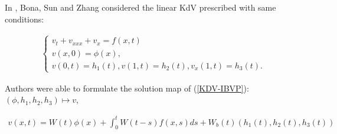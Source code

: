 \documentclass[10pt,a4paper,final]{article}
\numberwithin{equation}{section}
\begin{document}
In \cite{BSZ3}, Bona, Sun and Zhang considered the linear KdV prescribed with same conditions:

\begin{eqnarray}\label{KDV-IBVP}
\begin{cases}
v_t + v_{xxx} + v_x = f(x,t)\\
v(x,0)=\phi(x),\\
v(0,t)=h_1(t), v(1,t)=h_2(t), v_x(1,t)=h_3(t). 
\end{cases}
\end{eqnarray}

Authors were able to formulate the solution map of (\ref{KDV-IBVP}): $(\phi, h_1, h_2, h_3)\mapsto v$, 

\begin{eqnarray*}
v(x, t)=W(t)\phi(x) +\int_0^t W(t-s)f(x,s)ds +  W_b(t)(h_1(t), h_2(t), h_3(t))
\end{eqnarray*}
\end{document}
